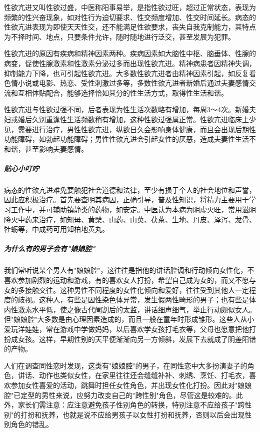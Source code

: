 性欲亢进又叫性欲过盛，中医称阳事易举，是指性欲过旺，超过正常状态，表现为频繁的性兴奋现象，如对性行为迫切要求、性交频度增加、性交时间延长。病态的性欲亢进表现为即使天天性交，还不能满足性欲要求，丧失自我克制能力，其特点为不择时间、地点，只要条件允许，随时随地进行泛交，甚至发展为犯罪。

性欲亢进的原因有疾病和精神因素两种。疾病因素如大脑性中枢、脑垂体、性腺的病变，促使性腺激素和性激素分泌过多而出现性欲亢进。精神病患者因精神失调，抑制能力下降，也可引起性欲亢进。大多数性欲亢进者由精神因素引起，如反复看色情小说或电影、热恋、受性刺激过多等，多数性欲亢进者新婚后通过夫妻感情交流和互相体贴配合，能够选择恰如其分的性生活方式，取得性生活和谐。

性欲亢进与性欲过强不同，后者表现为性生活次数略有增加，每周3～4次。新婚夫妇或婚后久别重逢性生活频数稍有增加，这种性欲过强属正常。性欲亢进临床上少见，需要进行治疗，男性性欲亢进，纵欲日久会影响身体健康，而且会出现后期性功能障碍，如勃起功能障碍；男性性欲亢进会引起女性的厌恶，造成夫妻性生活不和谐，甚至影响夫妻感情。

\subparagraph{贴心小叮咛}

病态的性欲亢进难免要触犯社会道德和法律，至少有损于个人的社会地位和声誉，因此应积极治疗。首先要查明其病因，正确引导，普及性知识，将精力主要用于学习工作中，并可辅助镇静类的药物，如安定。中医认为本病为阴虚火旺，常用滋阴降火中药来治疗，如知母、黄檗、山药、山萸、茯茶、生地、丹皮、泽泻、龙骨、牡蛎等，中成药可用知柏地黄丸。

\subparagraph{为什么有的男子会有"娘娘腔"}

我们常听说某个男人有"娘娘腔"，这往往是指他的讲话腔调和行动倾向女性化，不喜欢参加剧烈的运动和游戏，有的喜欢女人打扮，希望自己成为女的，而又不愿与女的多接触交往。这种男性不同程度的女性化倾向和爱好，往往受到其他人一定程度的歧视。这种人，有些是因性染色体异常，发生假两性畸形的男子；也有些是体内性激素水平低，使之像古代阉割后的太监，讲话细声细气，举止行动颇似女人。但"娘娘腔"大多数是由心理因素造成的，而且一般在童年时形成雏形。这些人从小爱玩洋娃娃，常在游戏中学做妈妈，以后喜欢学女孩打毛衣等，父母也愿意把他打扮成女孩。这样，早期性别的天平便渐渐向另一方倾斜，发展下去就成了阴差阳错的产物。

人们在调查同性恋时发现，这类有"娘娘腔"的男子，在同性恋中大多扮演妻子的角色，讲话、动作也类似女性，在家里往往还会缝缝补补、刺绣、烹饪、打毛衣，喜欢参加女性喜爱的活动，跳舞时担任女性角色，并出现女性化打扮。因此对"娘娘腔"已定型的男性来说，应努力改变自己的"跨性别"角色，尽管这是较难的。此外，家长们需注意：应注意避免孩子性别角色的转换，特别注意不应给孩子"跨性别"的打扮和抚养，也就是说不应给男孩子以女性打扮和抚养，否则以后会出现性别角色的错乱。

